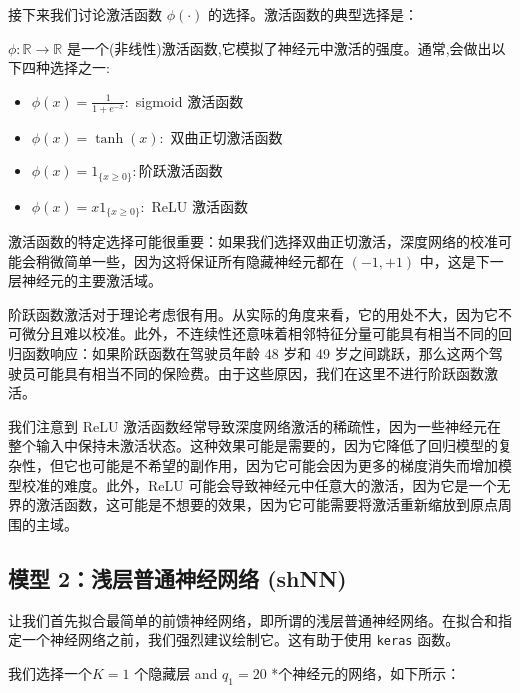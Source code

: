 \documentclass[
]{article}
\begin{document}
接下来我们讨论激活函数 \(\phi(\cdot)\) 的选择。激活函数的典型选择是：

\(\phi:\mathbb{R}\to\mathbb{R}\)
是一个(非线性)激活函数,它模拟了神经元中激活的强度。通常,会做出以下四种选择之一:

\begin{itemize}
\item
  \(\phi(x)=\frac{1}{1+e^{-x}}:\) sigmoid 激活函数
\item
  \(\phi(x)=\tanh(x):\) 双曲正切激活函数
\item
  \(\phi(x)=1_{\{x\geq0\}}:\)阶跃激活函数
\item
  \(\phi(x)=x1_{\{x\geq0\}}:\) ReLU 激活函数
\end{itemize}

激活函数的特定选择可能很重要：如果我们选择双曲正切激活，深度网络的校准可能会稍微简单一些，因为这将保证所有隐藏神经元都在
\((-1,+1)\) 中，这是下一层神经元的主要激活域。

阶跃函数激活对于理论考虑很有用。从实际的角度来看，它的用处不大，因为它不可微分且难以校准。此外，不连续性还意味着相邻特征分量可能具有相当不同的回归函数响应：如果阶跃函数在驾驶员年龄
48 岁和 49
岁之间跳跃，那么这两个驾驶员可能具有相当不同的保险费。由于这些原因，我们在这里不进行阶跃函数激活。

我们注意到 ReLU
激活函数经常导致深度网络激活的稀疏性，因为一些神经元在整个输入中保持未激活状态。这种效果可能是需要的，因为它降低了回归模型的复杂性，但它也可能是不希望的副作用，因为它可能会因为更多的梯度消失而增加模型校准的难度。此外，ReLU
可能会导致神经元中任意大的激活，因为它是一个无界的激活函数，这可能是不想要的效果，因为它可能需要将激活重新缩放到原点周围的主域。

\subsection{模型 2：浅层普通神经网络
(shNN)}\label{ux6a21ux578b-2ux6d45ux5c42ux666eux901aux795eux7ecfux7f51ux7edc-shnn}

让我们首先拟合最简单的前馈神经网络，即所谓的浅层普通神经网络。在拟合和指定一个神经网络之前，我们强烈建议绘制它。这有助于使用
\texttt{keras} 函数。

我们选择一个\(K=1\) 个隐藏层 and \(q_1=20\) *个神经元的网络，如下所示：
\end{document}
